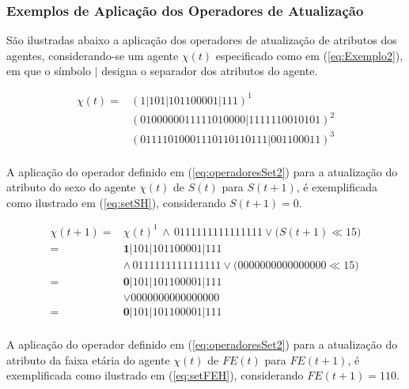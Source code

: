 \newpage

\subsubsection{Exemplos de Aplicação dos Operadores de Atualização}

São ilustradas abaixo a aplicação dos operadores de atualização de atributos dos agentes, considerando-se um agente $\chi(t)$ especificado como em (\ref{eq:Exemplo2}), em que o símbolo $|$ designa o separador dos atributos do agente. 

\begin{equation}
\begin{split}
 \chi(t) =   & (1 | 1 0 1 | 1 0 1 1 0 0 0 0 1 | 1 1 1)^1 \\
	     & (0 1 0 0 0 0 0 0 1 1 1 1 1 0 1 0 0 0 0 | 1 1 1 1 1 1 0 0 1 0 1 0 1)^2 \\
	     & (0 1 1 1 1 0 1 0 0 0 1 1 1 0 1 1 0 1 1 0 1 1 1 | 0 0 1 1 0 0 0 1 1)^3 \\
 \label{eq:Exemplo2}
\end{split}
\end{equation}

A aplicação do operador definido em (\ref{eq:operadoresSet2}) para a atualização do atributo do sexo do agente $\chi(t)$ de $S(t)$ para $S(t + 1)$, é exemplificada como ilustrado em (\ref{eq:setSH}), considerando $S(t + 1) = 0$.

\begin{equation}
 \begin{split}
 \chi(t + 1)   = & \chi(t)^1 \, \wedge \, 0111111111111111 \vee \big(S(t + 1) \ll 15\big) \\
	       = & \boldsymbol{1} | 1 0 1 | 1 0 1 1 0 0 0 0 1 | 1 1 1 \, \\ 
	         & \wedge \, 0111111111111111 \vee \big(0000000000000000 \ll 15\big) \\
	       = & \boldsymbol{0} | 1 0 1 | 1 0 1 1 0 0 0 0 1 | 1 1 1 \\ 
	         & \vee 0000000000000000 \\
	       = & \boldsymbol{0} | 1 0 1 | 1 0 1 1 0 0 0 0 1 | 1 1 1 \\
 \label{eq:setSH}
 \end{split}
\end{equation}

A aplicação do operador definido em (\ref{eq:operadoresSet2}) para a atualização do atributo da faixa etária do agente $\chi(t)$ de $FE(t)$ para $FE(t + 1)$, é exemplificada como ilustrado em (\ref{eq:setFEH}), considerando $FE(t + 1) = 1 1 0$.

